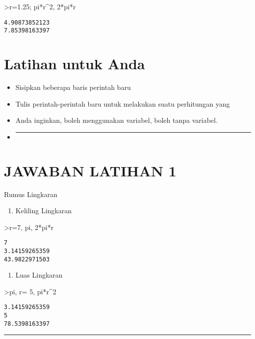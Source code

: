 \documentclass[
]{book}
\providecommand{\tightlist}{%
  \setlength{\itemsep}{0pt}\setlength{\parskip}{0pt}}
\begin{document}
\textgreater r=1.25; pi*r\^{}2, 2*pi*r

\begin{verbatim}
4.90873852123
7.85398163397
\end{verbatim}

\section{Latihan untuk Anda}\label{latihan-untuk-anda}

\begin{itemize}
\item
  Sisipkan beberapa baris perintah baru
\item
  Tulis perintah-perintah baru untuk melakukan suatu perhitungan yang
\item
  Anda inginkan, boleh menggunakan variabel, boleh tanpa variabel.
\item
  \begin{center}\rule{0.5\linewidth}{0.5pt}\end{center}
\end{itemize}

\section{JAWABAN LATIHAN 1}\label{jawaban-latihan-1}

Rumus Lingkaran

\begin{enumerate}
\def\labelenumi{\arabic{enumi}.}
\tightlist
\item
  Keliling Lingkaran
\end{enumerate}

\textgreater r=7, pi, 2*pi*r

\begin{verbatim}
7
3.14159265359
43.9822971503
\end{verbatim}

\begin{enumerate}
\def\labelenumi{\arabic{enumi}.}
\setcounter{enumi}{1}
\tightlist
\item
  Luas Lingkaran
\end{enumerate}

\textgreater pi, r= 5, pi*r\^{}2

\begin{verbatim}
3.14159265359
5
78.5398163397
\end{verbatim}

\begin{center}\rule{0.5\linewidth}{0.5pt}\end{center}
\end{document}
